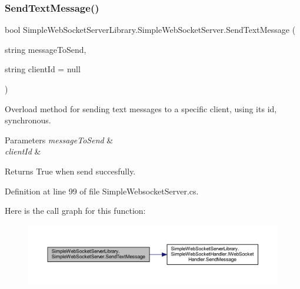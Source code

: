\subsubsection{\texorpdfstring{Send\+Text\+Message()}{SendTextMessage()}}
{\footnotesize\ttfamily bool Simple\+Web\+Socket\+Server\+Library.\+Simple\+Web\+Socket\+Server.\+Send\+Text\+Message (\begin{DoxyParamCaption}\item[{string}]{message\+To\+Send,  }\item[{string}]{client\+Id = {\ttfamily null} }\end{DoxyParamCaption})}



Overload method for sending text messages to a specific client, using it\textquotesingle{}s id, synchronous. 


\begin{DoxyParams}{Parameters}
{\em message\+To\+Send} & \\
\hline
{\em client\+Id} & \\
\hline
\end{DoxyParams}
\begin{DoxyReturn}{Returns}
True when send succesfully.
\end{DoxyReturn}


Definition at line 99 of file Simple\+Websocket\+Server.\+cs.

Here is the call graph for this function\+:
\nopagebreak
\begin{figure}[H]
\begin{center}
\leavevmode
\includegraphics[width=350pt]{class_simple_web_socket_server_library_1_1_simple_web_socket_server_a4ea5479402f769e2e73a8bcc06b654b1_cgraph}
\end{center}
\end{figure}
\mbox{\label{class_simple_web_socket_server_library_1_1_simple_web_socket_server_aefe75fd888dea52bd64108dd03abed61}} 

